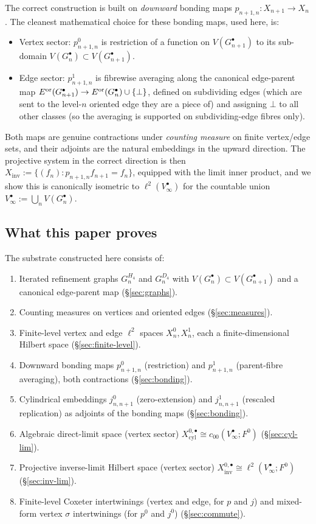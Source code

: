 \documentclass[11pt, a4paper]{amsart}
\theoremstyle{definition}
\newcommand{\inv}{\mathrm{inv}}
\newcommand{\cyl}{\mathrm{cyl}}
\begin{document}
The correct construction is built on \emph{downward} bonding maps
$p_{n+1, n} \colon X_{n+1} \to X_n$. The cleanest mathematical
choice for these bonding maps, used here, is:
\begin{itemize}
\item Vertex sector: $p_{n+1, n}^0$ is restriction of a function on
  $V(G_{n+1}^\bullet)$ to its sub-domain $V(G_n^\bullet)
  \subset V(G_{n+1}^\bullet)$.
\item Edge sector: $p_{n+1, n}^1$ is fibrewise averaging along the
  canonical edge-parent map
  $E^{\rm or}(G_{n+1}^\bullet) \to E^{\rm or}(G_n^\bullet) \cup
  \{\bot\}$, defined on subdividing edges (which are sent to the
  level-$n$ oriented edge they are a piece of) and assigning
  $\bot$ to all other classes (so the averaging is supported on
  subdividing-edge fibres only).
\end{itemize}

Both maps are genuine contractions under \emph{counting measure}
on finite vertex/edge sets, and their adjoints are the natural
embeddings in the upward direction. The projective system in the
correct direction is then $X_\inv := \{(f_n) : p_{n+1, n} f_{n+1} =
f_n\}$, equipped with the limit inner product, and we show this is
canonically isometric to $\ell^2(V_\infty^\bullet)$ for the
countable union $V_\infty^\bullet := \bigcup_n V(G_n^\bullet)$.

\subsection{What this paper proves}

The substrate constructed here consists of:
\begin{enumerate}
\item Iterated refinement graphs $G_n^{H_4}$ and $G_n^{D_4}$ with
  $V(G_n^\bullet) \subset V(G_{n+1}^\bullet)$ and a canonical
  edge-parent map (\S\ref{sec:graphs}).
\item Counting measures on vertices and oriented edges
  (\S\ref{sec:measures}).
\item Finite-level vertex and edge $\ell^2$ spaces $X_n^0, X_n^1$,
  each a finite-dimensional Hilbert space
  (\S\ref{sec:finite-level}).
\item Downward bonding maps $p_{n+1, n}^0$ (restriction) and
  $p_{n+1, n}^1$ (parent-fibre averaging), both contractions
  (\S\ref{sec:bonding}).
\item Cylindrical embeddings $j_{n, n+1}^0$ (zero-extension) and
  $j_{n, n+1}^1$ (rescaled replication) as adjoints of the bonding
  maps (\S\ref{sec:bonding}).
\item Algebraic direct-limit space (vertex sector)
  $X_\cyl^{0, \bullet} \cong c_{00}(V_\infty^\bullet; F^0)$
  (\S\ref{sec:cyl-lim}).
\item Projective inverse-limit Hilbert space (vertex sector)
  $X_\inv^{0, \bullet} \cong \ell^2(V_\infty^\bullet; F^0)$
  (\S\ref{sec:inv-lim}).
\item Finite-level Coxeter intertwinings (vertex and edge,
  for $p$ and $j$) and mixed-form vertex $\sigma$ intertwinings
  (for $p^0$ and $j^0$) (\S\ref{sec:commute}).
\end{enumerate}
\end{document}
